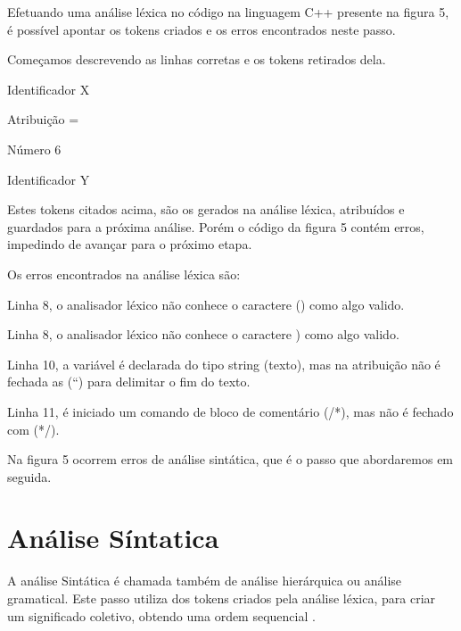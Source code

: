 \documentclass[12pt,oneside,a4paper,chapter=TITLE,section=TITLE,sumario=tradicional]{abntex2}
\begin{document}
Efetuando uma análise léxica no código na linguagem C++ presente na figura 5, é possível apontar os tokens criados e os erros encontrados neste passo. 

Começamos descrevendo as linhas corretas e os tokens retirados dela.

\begin{lista}
	\item Identificador    X 
	\item Atribuição        = 
	\item Número            6 
	\item Identificador    Y
\end{lista}

Estes tokens citados acima, são os gerados na análise léxica, atribuídos e guardados para a próxima análise. Porém o código da figura 5 contém erros, impedindo de avançar para o próximo etapa.

Os erros encontrados na análise léxica são:

\begin{lista}
	\item Linha 8, o analisador léxico não conhece o caractere () como algo valido.
	\item Linha 8, o analisador léxico não conhece o caractere ) como algo valido.
	\item Linha 10, a variável é declarada do tipo string (texto), mas na atribuição não é fechada as (“) para delimitar o fim do texto.
	\item Linha 11, é iniciado um comando de bloco de comentário (/*), mas não é fechado com (*/).
\end{lista}

\begin{figure}[htb]
\end{figure}

Na figura 5 ocorrem erros de análise sintática, que é o passo que abordaremos em seguida.

\section{Análise Síntatica}
\label{sec:analise-sintatica}

A análise Sintática é chamada também de análise hierárquica ou análise gramatical. Este passo utiliza dos tokens criados pela análise léxica, para criar um significado coletivo, obtendo uma ordem sequencial \cite{alfred1995}.
\end{document}
